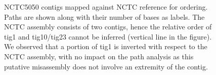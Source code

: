 \documentclass[./main.tex]{subfiles}
\begin{document}
\begin{figure}[!hb]

        


\caption{
NCTC5050 contigs mapped against NCTC reference for ordering. Paths are shown along with their number of bases as labels. The NCTC assembly consists of two contigs, hence the relative order of tig1 and tig10/tig23 cannot be inferred (vertical line in the figure). We observed that a portion of tig1 is inverted with respect to the NCTC assembly, with no impact on the path analysis as this putative misassembly does not involve an extremity of the contig.
%
}
\label{fg:appendix:NCTC5050}
\end{figure}
\end{document}
